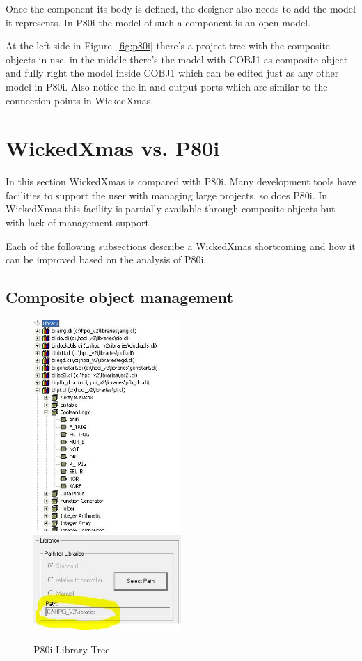 \documentclass[a4paper,11pt,final]{article}
\begin{document}
Once the component its body is defined, the designer also needs to add the model 
it represents. In P80i the model of such a component is an open model.

At the left side in Figure~\ref{fig:p80i} there's a project tree with the composite objects in use,
in the middle there's the model with COBJ1 as composite object and fully right the model
inside COBJ1 which can be edited just as any other model in P80i. Also
notice the in and output ports which are similar to the connection points
in WickedXmas.


\newpage
\section{WickedXmas vs. P80i}

In this section WickedXmas is compared with P80i.
Many development tools have facilities to support the user with managing
large projects, so does P80i. In WickedXmas this facility is partially available
through composite objects but with lack of management support.

Each of the following subsections describe a WickedXmas shortcoming and
how it can be improved based on the analysis of P80i.

\subsection{Composite object management}

\begin{figure}[here]
\includegraphics[width=0.5\textwidth]{p80i_library}
\includegraphics[width=0.5\textwidth]{p80i_library_setup}
\caption{P80i Library Tree}
\label{fig:p80i_library}
\end{figure}
\end{document}
